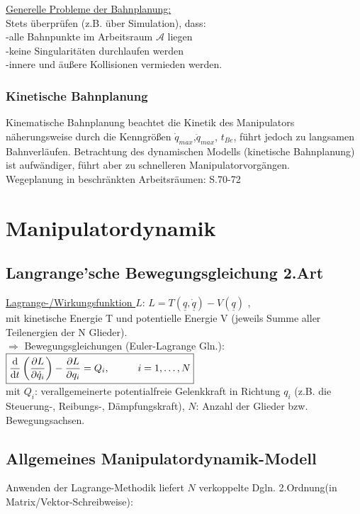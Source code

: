 \documentclass[a4paper,landscape,6pt]{article}
\newcommand{\ma}[1]{\ensuremath{\boldsymbol {#1}}}								%
\newcommand{\ul}[1]{\underline{#1}}
\begin{document}
\begin{multicols}{3}
 \ul{Generelle Probleme der Bahnplanung:}\\
 Stets überprüfen (z.B. über Simulation), dass:\\
 -alle Bahnpunkte im Arbeitsraum $\ma{\mathcal{A}}$ liegen\\
 -keine Singularitäten durchlaufen werden\\
 -innere und äußere Kollisionen vermieden werden.
 \subsubsection*{Kinetische Bahnplanung}
 Kinematische Bahnplanung beachtet die Kinetik des Manipulators näherungsweise durch die Kenngrößen $\dot q_{max}$,$\ddot q_{max}$, $t_{Be}$, führt jedoch zu langsamen Bahnverläufen. Betrachtung des dynamischen Modells (kinetische Bahnplanung) ist aufwändiger, führt aber zu schnelleren Manipulatorvorgängen.\\
 
 Wegeplanung in beschränkten Arbeitsräumen: S.70-72
 \section{Manipulatordynamik}
 \subsection*{Langrange'sche Bewegungsgleichung 2.Art}
 \ul{Lagrange-/Wirkungsfunktion $L$}: $\boxed{L = T(\ul q,\ul{\dot q}) - V(\ul q)}$ , \\
 mit kinetische Energie T und potentielle Energie V
 (jeweils Summe aller Teilenergien der N Glieder).\\
 $\Rightarrow$ Bewegungsgleichungen (Euler-Lagrange Gln.):\\
 
 \tab $\boxed{\frac{\mathrm{d}}{\mathrm{d}t} \left( \frac{\partial L}{\partial \dot q_i} \right) - \frac{\partial L}{\partial q_i}  = Q_i, \hspace*{1cm} i = 1,\dots,N}$\\
 
 mit $Q_i$: verallgemeinerte potentialfreie Gelenkkraft in Richtung $q_i$ (z.B. die Steuerung-, Reibungs-, Dämpfungskraft), $N$: Anzahl der Glieder bzw. Bewegungsachsen.
\subsection*{Allgemeines Manipulatordynamik-Modell}
 Anwenden der Lagrange-Methodik liefert $N$ verkoppelte Dgln. 2.Ordnung(in Matrix/Vektor-Schreibweise):\\
 

\end{multicols}
\end{document}
